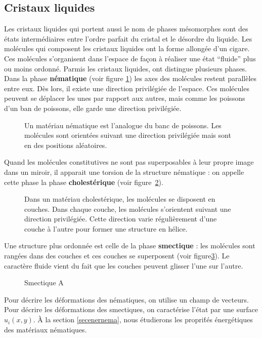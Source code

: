 \documentclass[12pt]{book}
\begin{document}
\subsection{Cristaux liquides}\label{secristliquides}
Les cristaux liquides \cite{ph:liqcr:Veyssie94,ph:liqcr:DeGennes74}
qui portent aussi le nom de phases m\'esomorphes 
sont des \'etats interm\'ediaires entre l'ordre parfait du cristal et
le d\'esordre du liquide. Les mol\'ecules qui composent les cristaux
liquides ont la forme allong\'ee d'un cigare. Ces mol\'ecules
s'organisent dans l'espace de fa\c con \`a r\'ealiser une \'etat
``fluide'' plus ou moins ordonn\'e. Parmis les cristaux liquides, ont
distingue plusieurs phases.  Dans la phase {\bf n\'ematique} (voir figure
\ref{fignematique}) les axes des mol\'ecules restent parall\`eles
entre eux. D\`es lors, il existe une direction privil\'egi\'ee de
l'espace. Ces mol\'ecules peuvent se d\'eplacer les unes par rapport
aux autres, mais comme les poissons d'un ban de poissons, elle garde
une direction privil\'egi\'ee.
\begin{figure}[htb]
 \centerline{}   
 \caption{Un mat\'eriau n\'ematique est l'analogue du banc de
poissons. Les mol\'ecules sont orient\'ees suivant une direction
privil\'egi\'ee mais sont en des positions al\'eatoires.}
 \label{fignematique}
\end{figure}
Quand les mol\'ecules constitutives ne sont pas superposables \`a leur
propre image dans un miroir, il apparait une torsion de la structure
n\'ematique : on appelle cette phase la phase
{\bf cholest\'erique}  (voir
figure~\ref{figcholesteric}).
\begin{figure}[htb]
 \centerline{}   
 \caption{Dans un mat\'eriau cholest\'erique, les mol\'ecules se
disposent en couches. Dans chaque couche, les mol\'ecules s'orientent
suivant une direction privil\'egi\'ee. Cette direction varie
r\'eguli\`erement d'une couche \`a l'autre pour former une structure
en h\'elice.}
 \label{figcholesteric}
\end{figure}
Une structure plus ordonn\'ee est celle de la phase {\bf smectique} : les
mol\'ecules sont rang\'ees dans des couches et ces couches se
superposent (voir figure\ref{figsmectiqueA}). Le caract\`ere fluide
vient du fait que les couches peuvent glisser l'une sur l'autre.
\begin{figure}[htb]
 \centerline{}   
 \caption{Smectique A}
 \label{figsmectiqueA}
\end{figure}
Pour d\'ecrire les d\'eformations des n\'ematiques, on utilise un
champ de vecteurs. Pour d\'ecrire les d\'eformations des smectiques, on
caract\'erise l'\'etat par une surface $u_i(x,y)$.
\`A la section \ref{secenernema}, nous \'etudierons les propri\'t\'es
\'energ\'etiques des mat\'eriaux n\'ematiques.
\end{document}
